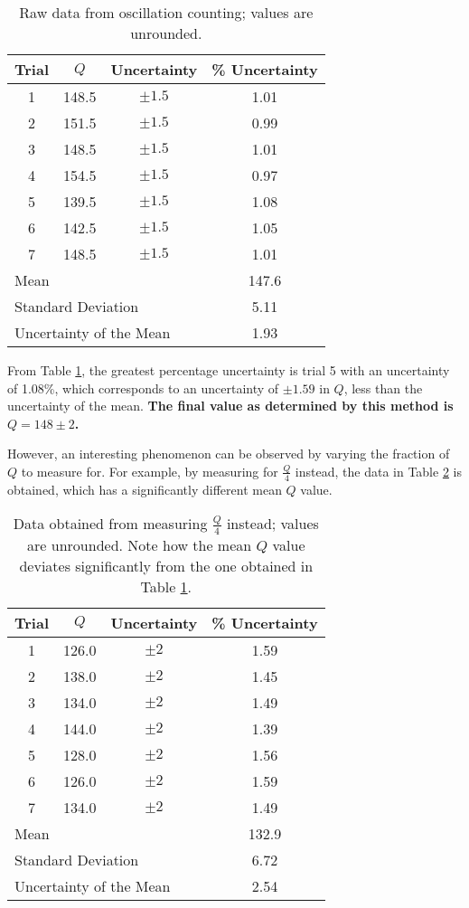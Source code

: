 \documentclass[aps,twocolumn,secnumarabic,nobalancelastpage,amsmath,amssymb,nofootinbib,floatfix,letterpaper]{revtex4}
\begin{document}
\begin{table}[ht]
    \begin{tabular}{c|c|c|c}
        Trial & \(Q\) & Uncertainty & \% Uncertainty \\
        \hline
        1   & 148.5 & \(\pm 1.5\) & 1.01 \\
        2   & 151.5 & \(\pm 1.5\) & 0.99 \\
        3	& 148.5 & \(\pm 1.5\) & 1.01 \\
        4	& 154.5 & \(\pm 1.5\) & 0.97 \\
        5	& 139.5 & \(\pm 1.5\) & 1.08 \\
        6	& 142.5 & \(\pm 1.5\) & 1.05 \\
        7	& 148.5 & \(\pm 1.5\) & 1.01 \\
        \hline
        \multicolumn{3}{l}{Mean} & 147.6 \\
        \multicolumn{3}{l}{Standard Deviation} & 5.11 \\
        \multicolumn{3}{l}{Uncertainty of the Mean} & 1.93
    \end{tabular}
    \caption{Raw data from oscillation counting; values are unrounded.}
    \label{table:lab1_osc}
\end{table}

From Table \ref{table:lab1_osc}, the greatest percentage uncertainty is trial 5 with an uncertainty of 1.08\%, which
corresponds to an uncertainty of \(\pm 1.59\) in \(Q\), less than the uncertainty of the mean. \textbf{The final value
as determined by this method is \(Q = 148 \pm 2\).}

However, an interesting phenomenon can be observed by varying the fraction of \(Q\) to measure for.
For example, by measuring for \(\frac{Q}{4}\) instead, the data in Table \ref{table:lab1_osc4} is obtained, which has a
significantly different mean \(Q\) value.

\begin{table}[ht]
    \begin{tabular}{c|c|c|c}
        Trial & \(Q\) & Uncertainty & \% Uncertainty \\
        \hline
        1   & 126.0 & \(\pm 2\) & 1.59 \\
        2   & 138.0 & \(\pm 2\) & 1.45 \\
        3	& 134.0 & \(\pm 2\) & 1.49 \\
        4	& 144.0 & \(\pm 2\) & 1.39 \\
        5	& 128.0 & \(\pm 2\) & 1.56 \\
        6	& 126.0 & \(\pm 2\) & 1.59 \\
        7	& 134.0 & \(\pm 2\) & 1.49 \\
        \hline
        \multicolumn{3}{l}{Mean} & 132.9 \\
        \multicolumn{3}{l}{Standard Deviation} & 6.72 \\
        \multicolumn{3}{l}{Uncertainty of the Mean} & 2.54
    \end{tabular}
    \caption{Data obtained from measuring \(\frac{Q}{4}\) instead; values are unrounded. Note how the mean
        \(Q\) value deviates significantly from the one obtained in Table \ref{table:lab1_osc}.}
    \label{table:lab1_osc4}
\end{table}
\end{document}
